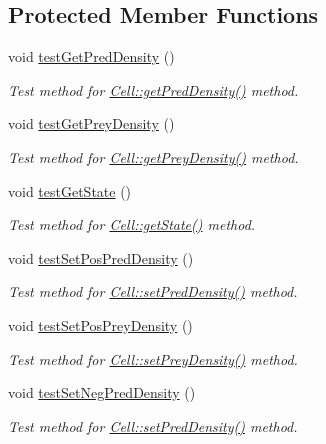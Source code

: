 \subsection*{Protected Member Functions}
\begin{DoxyCompactItemize}
\item 
void \hyperlink{class_test_cell_addf9f8fe038ba0d1543b134b04c8b3c7}{test\+Get\+Pred\+Density} ()
\begin{DoxyCompactList}\small\item\em Test method for \hyperlink{class_cell_af5ff36a4a4025053127a4ad77efb103f}{Cell\+::get\+Pred\+Density()} method. \end{DoxyCompactList}\item 
void \hyperlink{class_test_cell_ae253f8668d2328e298a94ac745086689}{test\+Get\+Prey\+Density} ()
\begin{DoxyCompactList}\small\item\em Test method for \hyperlink{class_cell_a0756af1c045a1488e2b4c2c16d87eec2}{Cell\+::get\+Prey\+Density()} method. \end{DoxyCompactList}\item 
void \hyperlink{class_test_cell_a5c2b39f6303c1ff791a000418f1edc6e}{test\+Get\+State} ()
\begin{DoxyCompactList}\small\item\em Test method for \hyperlink{class_cell_ab8c8914c6eb76fa53c4e77e692792435}{Cell\+::get\+State()} method. \end{DoxyCompactList}\item 
void \hyperlink{class_test_cell_abd30bc743823cff506c028decf6fa839}{test\+Set\+Pos\+Pred\+Density} ()
\begin{DoxyCompactList}\small\item\em Test method for \hyperlink{class_cell_adfd2fa8a4b91e18ca6195f34dbf00546}{Cell\+::set\+Pred\+Density()} method. \end{DoxyCompactList}\item 
void \hyperlink{class_test_cell_a0dd309da919dfb0e58dd371bbadffae5}{test\+Set\+Pos\+Prey\+Density} ()
\begin{DoxyCompactList}\small\item\em Test method for \hyperlink{class_cell_afd3a85027b67dfd4295e2e50253c1058}{Cell\+::set\+Prey\+Density()} method. \end{DoxyCompactList}\item 
void \hyperlink{class_test_cell_ac4beab5199462222e9b4d761d4e6c544}{test\+Set\+Neg\+Pred\+Density} ()
\begin{DoxyCompactList}\small\item\em Test method for \hyperlink{class_cell_adfd2fa8a4b91e18ca6195f34dbf00546}{Cell\+::set\+Pred\+Density()} method. \end{DoxyCompactList}\item 

\end{DoxyCompactItemize}
